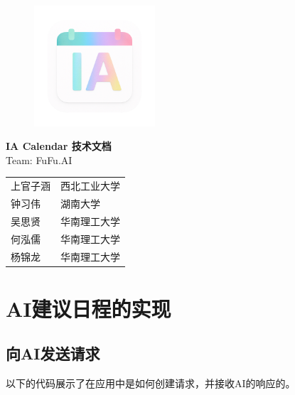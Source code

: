 \documentclass[fontset=windows]{ctexart}
\newcommand{\includecode}[2][]{%
}
\begin{document}
\begin{titlepage}
    \thispagestyle{empty}
    \vspace*{1cm}
    \centering
    \begin{figure}[h]
        \small
        \centering
        \includegraphics[width=0.4\textwidth]{./figure/LOGO.png}
    \end{figure}
    \vspace*{1cm}
    {\LARGE\bfseries IA Calendar 技术文档 \\[1.5em]}
    {\large Team: FuFu.AI \\[2em]}
    \vspace{1cm}
    {\normalsize
        \begin{tabular}{@{}ll@{}}
            上官子涵 & 西北工业大学 \\
            钟习伟  & 湖南大学   \\
            吴思贤  & 华南理工大学 \\
            何泓儒  & 华南理工大学 \\
            杨锦龙  & 华南理工大学 \\[2cm]
        \end{tabular}}

    \vfill
\end{titlepage}

\tableofcontents
\newpage{}

\clearpage
\pagestyle{fancy}
\setcounter{page}{1}

\vspace{2cm}

\section{AI建议日程的实现}
\subsection{向AI发送请求}
以下的代码展示了在应用中是如何创建请求，并接收AI的响应的。
\includecode[language=java,caption={与蓝心大模型交互代码}]{src/code1.java}
\end{document}
